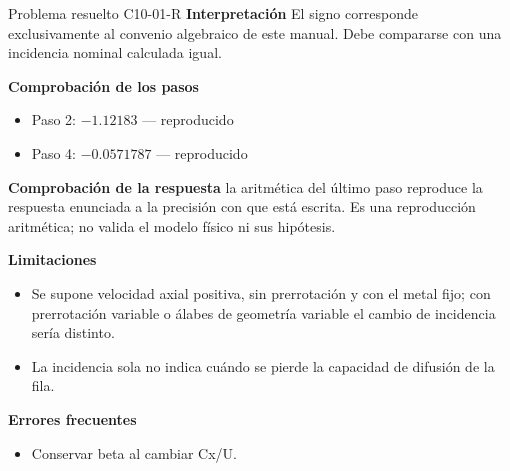 \documentclass[10pt,openany]{book}
\begin{document}
\begin{studiumworked}{Problema resuelto C10-01-R}
\noindent\textbf{Interpretación}
El signo corresponde exclusivamente al convenio algebraico de este manual. Debe compararse con una incidencia nominal calculada igual.

\noindent\textbf{Comprobación de los pasos}
\begin{itemize}
\item Paso 2: $-1.12183$ — reproducido
\item Paso 4: $-0.0571787$ — reproducido
\end{itemize}

\noindent\textbf{Comprobación de la respuesta} la aritmética del último paso reproduce la respuesta enunciada a la precisión con que está escrita. Es una reproducción aritmética; no valida el modelo físico ni sus hipótesis.

\noindent\textbf{Limitaciones}
\begin{itemize}
\item Se supone velocidad axial positiva, sin prerrotación y con el metal fijo; con prerrotación variable o álabes de geometría variable el cambio de incidencia sería distinto.
\item La incidencia sola no indica cuándo se pierde la capacidad de difusión de la fila.
\end{itemize}

\noindent\textbf{Errores frecuentes}
\begin{itemize}
\item Conservar beta al cambiar Cx/U.
\end{itemize}
\end{studiumworked}
\end{document}
